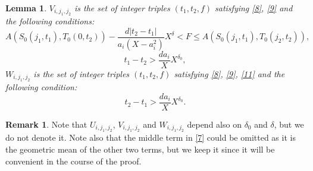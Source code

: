 \documentclass[12pt]{amsart}
\newtheorem{lemma}[theorem]{Lemma}
\theoremstyle{definition}
\newtheorem{remark}[theorem]{Remark}
\numberwithin{equation}{section}
\begin{document}
\begin{lemma}
$V_{i,j_1,j_2}$ is the set of integer triples $\left(t_1,t_2,f\right
)$ satisfying
\eqref{8}, \eqref{9} and the following conditions:
\begin{equation}A\left(S_0\left(j_1,t_1\right),T_0\left(0,t_2\right
)\right)-\frac {d\left|t_2-t_1\right|}{a_i\left(X-a_i^2\right)}X^{
\delta}<F\le A\left(S_0\left(j_1,t_1\right),T_0\left(j_2,t_2\right
)\right),\label{11}\end{equation}
\begin{equation}t_1-t_2>\frac {da_i}XX^{\delta_0},\label{11,1}\end{equation}
$W_{i,j_1,j_2}$ is the set of integer triples $\left(t_1,t_2,f\right
)$ satisfying
\eqref{8}, \eqref{9}, \eqref{11} and the following condition:
\begin{equation}t_2-t_1>\frac {da_i}XX^{\delta_0}.\label{11,2}\end{equation}
\end{lemma}

\begin{remark}Note that $U_{i,j_1,j_2}$, $V_{i,j_1,j_2}$ and $W_{
i,j_1,j_2}$
depend also on $\delta_0$ and $\delta$, but we do not denote it. Note
also that the middle term in \eqref{7} could be omitted as
it is the geometric mean of the other two terms,
but we keep it since it will be convenient in the course
of the proof.
\end{remark}
\end{document}
